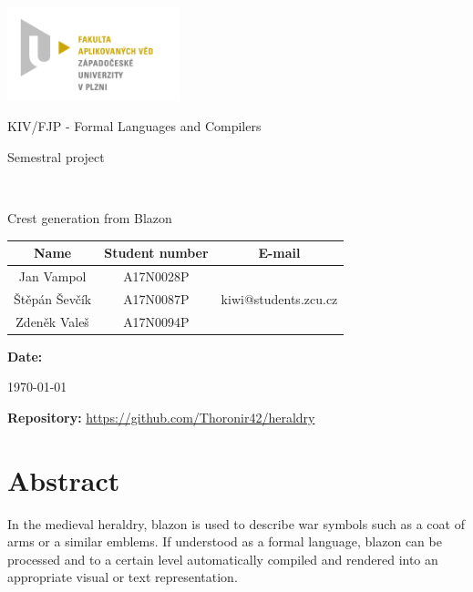 \documentclass[12pt,a4paper]{article}
\author{Štěpán Ševčík}
\let\oldsection\section
\renewcommand\section{\clearpage\oldsection}
\begin{document}
\begin{titlepage}

\includegraphics[width=50mm]{img/FAV.jpg}
\\[160 pt]
\centerline{ \Huge \sc KIV/FJP - Formal Languages and Compilers}
\centerline{ \huge \sc Semestral project}
\\[12 pt]
{\large \sc
\centerline{Crest generation from Blazon}
}


{
\vfill 
\parindent=0cm

\begin{center}
\begin{tabular}{|c | c | c |}
	\hline
	\textbf{Name} & \textbf{Student number} & \textbf{E-mail} \\ \hline
	Jan Vampol & A17N0028P & \\ \hline
	Štěpán Ševčík &  A17N0087P & kiwi@students.zcu.cz \\ \hline
	Zdeněk Valeš & A17N0094P & \\ \hline
\end{tabular}
\end{center}
\textbf{Date:} {\large \today\par} %
\textbf{Repository:} \url{https://github.com/Thoronir42/heraldry}

}

\end{titlepage}




\section{Abstract}
In the medieval heraldry, blazon is used to describe war symbols such as a coat of arms or a similar emblems. If understood as a formal language, blazon can be processed and to a certain level automatically compiled and rendered into an appropriate visual or text representation.
\end{document}

